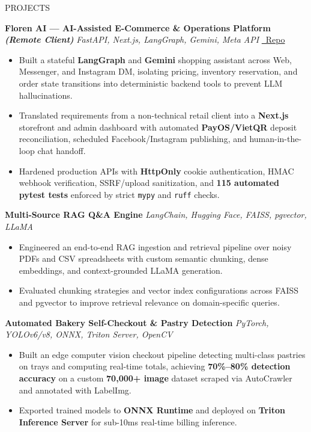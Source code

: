 \documentclass[10pt]{resume}
\begin{document}
\begin{rSection}{PROJECTS}

\textbf{Floren AI --- AI-Assisted E-Commerce \& Operations Platform \textit{(Remote Client)}}
\hfill \textit{FastAPI, Next.js, LangGraph, Gemini, Meta API}
\hfill \href{https://github.com/Hoangnt1209/floren-ai}{\faGithub\ Repo}

\begin{itemize}
    \item Built a stateful \textbf{LangGraph} and \textbf{Gemini} shopping assistant across Web, Messenger, and Instagram DM, isolating pricing, inventory reservation, and order state transitions into deterministic backend tools to prevent LLM hallucinations.
    \item Translated requirements from a non-technical retail client into a \textbf{Next.js} storefront and admin dashboard with automated \textbf{PayOS/VietQR} deposit reconciliation, scheduled Facebook/Instagram publishing, and human-in-the-loop chat handoff.
    \item Hardened production APIs with \textbf{HttpOnly} cookie authentication, HMAC webhook verification, SSRF/upload sanitization, and \textbf{115 automated pytest tests} enforced by strict \texttt{mypy} and \texttt{ruff} checks.
\end{itemize}

\textbf{Multi-Source RAG Q\&A Engine}
\hfill \textit{LangChain, Hugging Face, FAISS, pgvector, LLaMA}

\begin{itemize}
    \item Engineered an end-to-end RAG ingestion and retrieval pipeline over noisy PDFs and CSV spreadsheets with custom semantic chunking, dense embeddings, and context-grounded LLaMA generation.
    \item Evaluated chunking strategies and vector index configurations across FAISS and pgvector to improve retrieval relevance on domain-specific queries.
\end{itemize}

\textbf{Automated Bakery Self-Checkout \& Pastry Detection}
\hfill \textit{PyTorch, YOLOv6/v8, ONNX, Triton Server, OpenCV}

\begin{itemize}
    \item Built an edge computer vision checkout pipeline detecting multi-class pastries on trays and computing real-time totals, achieving \textbf{70\%--80\% detection accuracy} on a custom \textbf{70,000+ image} dataset scraped via AutoCrawler and annotated with LabelImg.
    \item Exported trained models to \textbf{ONNX Runtime} and deployed on \textbf{Triton Inference Server} for sub-10ms real-time billing inference.
\end{itemize}

\end{rSection}
\end{document}
